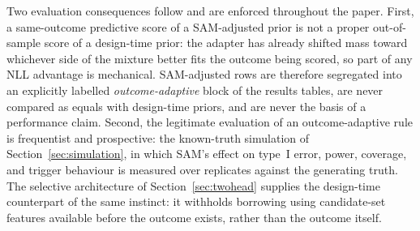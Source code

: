 \documentclass[11pt]{article}
\begin{document}
Two evaluation consequences follow and are enforced throughout the paper.
First, a same-outcome predictive score of a SAM-adjusted prior is not a proper
out-of-sample score of a design-time prior: the adapter has already shifted
mass toward whichever side of the mixture better fits the outcome being
scored, so part of any NLL advantage is mechanical. SAM-adjusted rows are
therefore segregated into an explicitly labelled \emph{outcome-adaptive} block
of the results tables, are never compared as equals with design-time priors,
and are never the basis of a performance claim. Second, the legitimate
evaluation of an outcome-adaptive rule is frequentist and prospective: the
known-truth simulation of Section~\ref{sec:simulation}, in which SAM's effect
on type~I error, power, coverage, and trigger behaviour is measured over
replicates against the generating truth. The selective architecture of
Section~\ref{sec:twohead} supplies the design-time counterpart of the same
instinct: it withholds borrowing using candidate-set features available before
the outcome exists, rather than the outcome itself.
\end{document}
